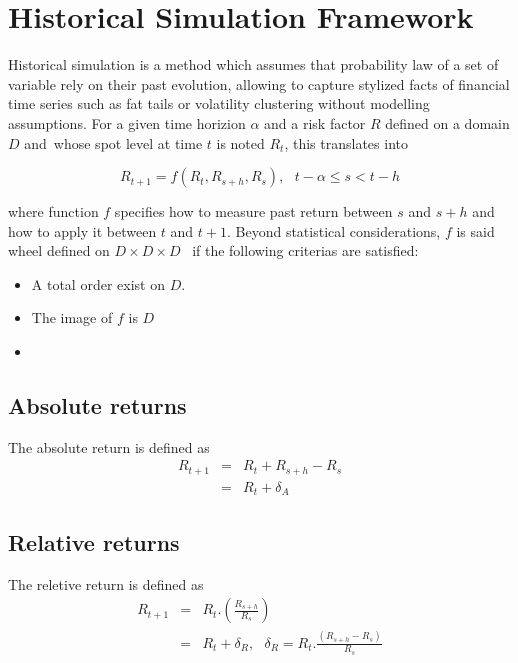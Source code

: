 \documentclass[3pt]{article}
\begin{document}
\bigskip 

\section{Historical Simulation Framework}

Historical simulation is a method which assumes that probability law of a
set of variable rely on their past evolution, allowing to capture stylized
facts of financial time series such as fat tails or volatility clustering
without modelling assumptions. For a given time horizion $\alpha $ and a
risk factor $R$ defined on a domain $D$ and\ whose spot level at time $t$ is
noted $R_{t}$, this translates into 

\begin{equation*}
R_{t+1}=f(R_{t},R_{s+h},R_{s}),\text{ \ \ }t-\alpha \leq s<t-h
\end{equation*}

\bigskip 

where function $f$ specifies how to measure past return between $s$ and $s+h$
and how to apply it between $t$ and $t+1.$ Beyond statistical
considerations, $f$ is said wheel defined on $D\times D\times D$ \ if the
following criterias are satisfied:

\bigskip 

\begin{itemize}
\item A total order exist on $D.$

\item The image of $f$ is $D$

\item 
\end{itemize}

\subsection{Absolute returns}

The absolute return is defined as%
\begin{eqnarray*}
R_{t+1} &=&R_{t}+R_{s+h}-R_{s} \\
&=&R_{t}+\delta _{A}
\end{eqnarray*}

\subsection{Relative returns}

\bigskip The reletive return is defined as%
\begin{eqnarray*}
R_{t+1} &=&R_{t}.\left( \frac{R_{s+h}}{R_{s}}\right)  \\
&=&R_{t}+\delta _{R},\text{ \ \ }\delta _{R}=R_{t}.\frac{\left(
R_{s+h}-R_{s}\right) }{R_{s}}
\end{eqnarray*}
\end{document}
